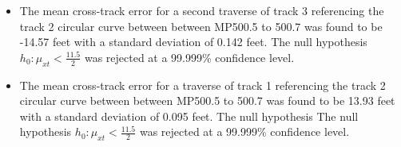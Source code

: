 \begin{enumerate}
\begin{itemize}
\item The mean cross-track error for a second traverse of track 3 referencing the track 2 circular curve between between MP500.5 to 500.7 was found to be -14.57 feet with a standard deviation of 0.142 feet. The null hypothesis $h_{0}: \mu_{xt} < \frac{11.5}{2}$ was rejected at a 99.999\% confidence level.
\item The mean cross-track error for a traverse of track 1 referencing the track 2 circular curve between between MP500.5 to 500.7 was found to be 13.93 feet with a standard deviation of 0.095 feet. The null hypothesis The null hypothesis $h_{0}: \mu_{xt} < \frac{11.5}{2}$ was rejected at a 99.999\% confidence level.

\end{itemize}
\end{enumerate}

